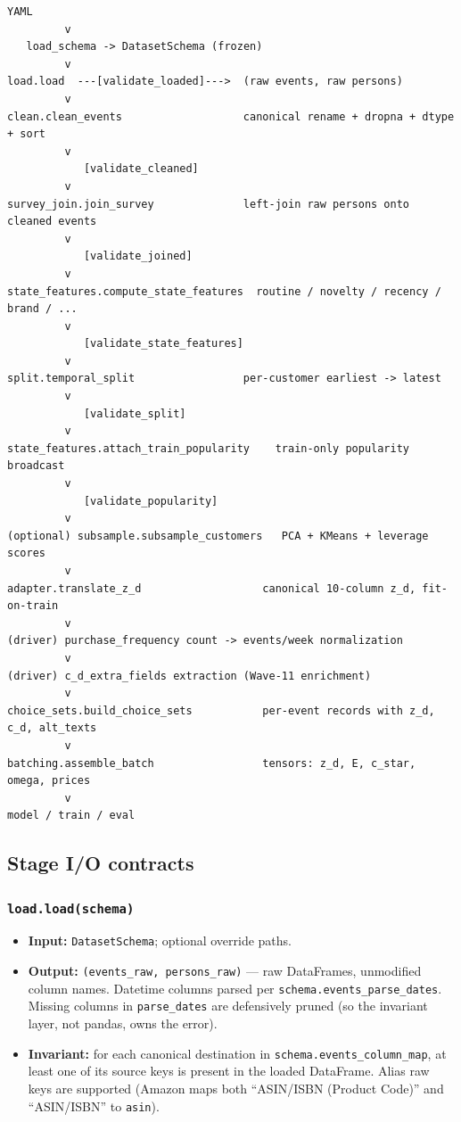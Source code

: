 \documentclass[11pt,a4paper]{article}
\begin{document}
\begin{lstlisting}[basicstyle=\ttfamily\scriptsize]
        YAML
         v
   load_schema -> DatasetSchema (frozen)
         v
load.load  ---[validate_loaded]--->  (raw events, raw persons)
         v
clean.clean_events                   canonical rename + dropna + dtype + sort
         v
            [validate_cleaned]
         v
survey_join.join_survey              left-join raw persons onto cleaned events
         v
            [validate_joined]
         v
state_features.compute_state_features  routine / novelty / recency / brand / ...
         v
            [validate_state_features]
         v
split.temporal_split                 per-customer earliest -> latest
         v
            [validate_split]
         v
state_features.attach_train_popularity    train-only popularity broadcast
         v
            [validate_popularity]
         v
(optional) subsample.subsample_customers   PCA + KMeans + leverage scores
         v
adapter.translate_z_d                   canonical 10-column z_d, fit-on-train
         v
(driver) purchase_frequency count -> events/week normalization
         v
(driver) c_d_extra_fields extraction (Wave-11 enrichment)
         v
choice_sets.build_choice_sets           per-event records with z_d, c_d, alt_texts
         v
batching.assemble_batch                 tensors: z_d, E, c_star, omega, prices
         v
model / train / eval
\end{lstlisting}

\subsection{Stage I/O contracts}

\subsubsection*{\texttt{load.load(schema)}}

\begin{itemize}
\item[$\triangleright$] \textbf{Input:} \texttt{DatasetSchema}; optional override paths.
\item[$\triangleright$] \textbf{Output:} \texttt{(events\_raw, persons\_raw)} — raw
DataFrames, unmodified column names. Datetime columns parsed per
\texttt{schema.events\_parse\_dates}. Missing columns in
\texttt{parse\_dates} are defensively pruned (so the invariant
layer, not pandas, owns the error).
\item[$\triangleright$] \textbf{Invariant:} for each canonical destination in
\texttt{schema.events\_column\_map}, at least one of its source
keys is present in the loaded DataFrame. Alias raw keys are
supported (Amazon maps both ``ASIN/ISBN (Product Code)'' and
``ASIN/ISBN'' to \texttt{asin}).
\end{itemize}
\end{document}
